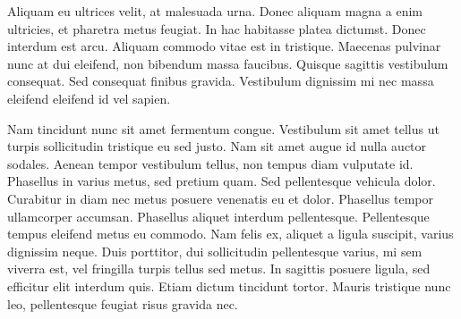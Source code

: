\documentclass[a4paper,twoside=false,12pt,spanish,DIV=7]{scrbook}
\begin{document}
Aliquam eu ultrices velit, at malesuada urna. Donec aliquam magna a enim ultricies, et pharetra metus feugiat. In hac habitasse platea dictumst. Donec interdum est arcu. Aliquam commodo vitae est in tristique. Maecenas pulvinar nunc at dui eleifend, non bibendum massa faucibus. Quisque sagittis vestibulum consequat. Sed consequat finibus gravida. Vestibulum dignissim mi nec massa eleifend eleifend id vel sapien.

Nam tincidunt nunc sit amet fermentum congue. Vestibulum sit amet tellus ut turpis sollicitudin tristique eu sed justo. Nam sit amet augue id nulla auctor sodales. Aenean tempor vestibulum tellus, non tempus diam vulputate id. Phasellus in varius metus, sed pretium quam. Sed pellentesque vehicula dolor. Curabitur in diam nec metus posuere venenatis eu et dolor. Phasellus tempor ullamcorper accumsan. Phasellus aliquet interdum pellentesque. Pellentesque tempus eleifend metus eu commodo. Nam felis ex, aliquet a ligula suscipit, varius dignissim neque. Duis porttitor, dui sollicitudin pellentesque varius, mi sem viverra est, vel fringilla turpis tellus sed metus. In sagittis posuere ligula, sed efficitur elit interdum quis. Etiam dictum tincidunt tortor. Mauris tristique nunc leo, pellentesque feugiat risus gravida nec.
\end{document}
